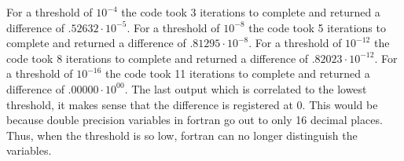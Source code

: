 For a threshold of $10^{-4}$ the code took 3 iterations to complete and returned a difference of $.52632 \cdot 10^{-5}$. For a threshold of $10^{-8}$ the code took 5 iterations to complete and returned a difference of $.81295 \cdot 10^{-8}$. For a threshold of $10^{-12}$ the code took 8 iterations to complete and returned a difference of $.82023 \cdot 10^{-12}$. For a threshold of $10^{-16}$ the code took 11 iterations to complete and returned a difference of $.00000 \cdot 10^{00}$. The last output which is correlated to the lowest threshold, it makes sense that the difference is registered at 0. This would be because double precision variables in fortran go out to only 16 decimal places. Thus, when the threshold is so low, fortran can no longer distinguish the variables. 
